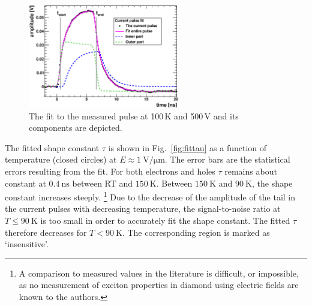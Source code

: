 \begin{figure}[t]
 \centering
 \includegraphics[width=0.59\textwidth]{figures/ex_pulsefit3}%
 \caption{The fit to the measured pulse at 100\,K and 500\,V and its components are depicted.}
 \label{fig:ExModel2}
\end{figure}


The fitted shape constant $\tau$ is shown in Fig.~\ref{fig:fittau}
 as a function of temperature (closed circles) at $E \approx \SI{1}{\volt/\micro\meter}$. 
The error bars are the statistical errors resulting from the fit. 
For both electrons and holes $\tau$ remains about constant at $\SI{0.4}{\ns}$ between RT and $\SI{150}{\kelvin}$. 
Between $\SI{150}{\kelvin}$ and $\SI{90}{\kelvin}$, the shape constant increases steeply.%
\footnote{A comparison to measured values in the literature is difficult, or impossible,
 as no measurement of exciton properties in diamond using electric fields are known to the authors.}
Due to the decrease of the amplitude of the tail in the current pulses with decreasing temperature, the signal-to-noise ratio at $T \leq \SI{90}{\kelvin}$
 is too small in order to accurately fit the shape constant. 
The fitted $\tau$ therefore decreases for $T < \SI{90}{\kelvin}$. 
The corresponding region is marked as `insensitive'. 

